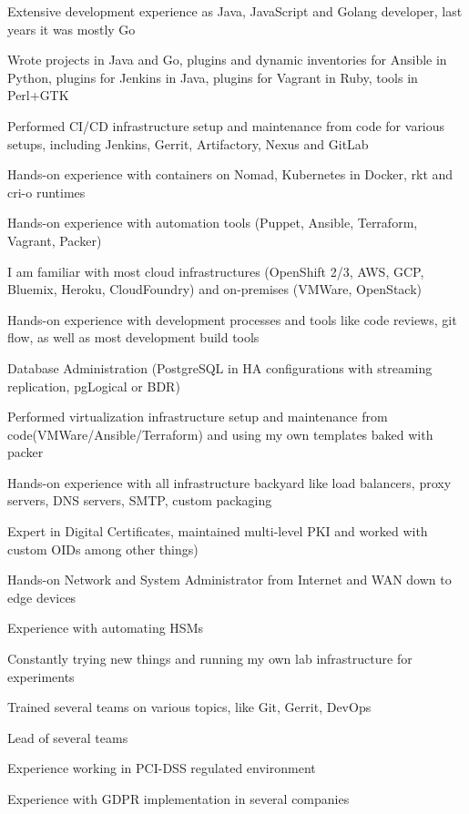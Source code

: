 \documentclass[letterpaper,11pt]{article}
\begin{document}
	Extensive development experience as Java, JavaScript and Golang developer, last years it was mostly Go
		
	Wrote projects in Java and Go, plugins and dynamic inventories for Ansible in Python, plugins for Jenkins in Java, plugins for Vagrant in Ruby, tools in Perl+GTK
	
	Performed CI/CD infrastructure setup and maintenance from code for various setups, including Jenkins, Gerrit, Artifactory, Nexus and GitLab
	
	Hands-on experience with containers on Nomad, Kubernetes in Docker, rkt and cri-o runtimes
	
	Hands-on experience with automation tools (Puppet, Ansible, Terraform, Vagrant, Packer)
	
	I am familiar with most cloud infrastructures (OpenShift 2/3, AWS, GCP, Bluemix, Heroku, CloudFoundry) and on-premises (VMWare, OpenStack)
	
	Hands-on experience with development processes and tools like code reviews, git flow, as well as most development build tools
	
	Database Administration (PostgreSQL in HA configurations with streaming replication, pgLogical or BDR)
	
	Performed virtualization infrastructure setup and maintenance from code(VMWare/Ansible/Terraform) and using my own templates baked with packer
		
	Hands-on experience with all infrastructure backyard like load balancers, proxy servers, DNS servers, SMTP, custom packaging
	
	Expert in Digital Certificates, maintained multi-level PKI and worked with custom OIDs among other things)
	
	Hands-on Network and System Administrator from Internet and WAN down to edge devices
	
	Experience with automating HSMs

	Constantly trying new things and running my own lab infrastructure for experiments
	
	Trained several teams on various topics, like Git, Gerrit, DevOps
	
	Lead of several teams
	
	Experience working in PCI-DSS regulated environment
	
	Experience with GDPR implementation in several companies
	

\end{document}
